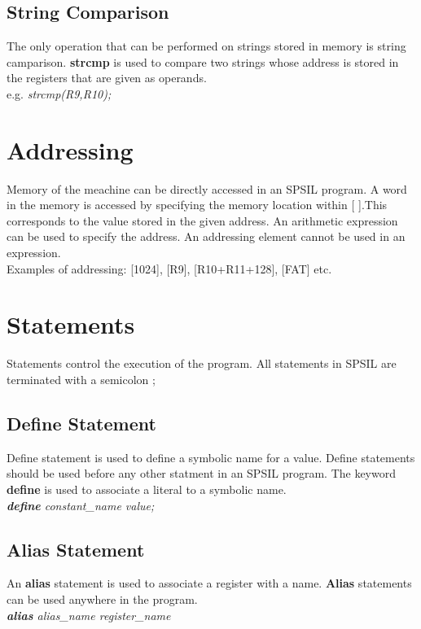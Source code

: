 \documentclass[11pt]{article}
\begin{document}
\subsection{String Comparison}
The only operation that can be performed on strings stored in memory is string camparison. \textbf{strcmp} is used to compare two strings whose address is stored in the registers that are given as operands. \\

 e.g. \textit{strcmp(R9,R10);}


\section{Addressing}
Memory of the meachine can be directly accessed in an SPSIL program. A word in the memory is accessed by specifying the memory location within [ ].This  corresponds to the value stored in the given address. An arithmetic expression can be used to specify the address. An addressing element cannot be used in an expression. \\

Examples of addressing: [1024], [R9], [R10+R11+128], [FAT] etc.

\section{Statements}

Statements control the execution of the program. All statements in SPSIL are terminated with a semicolon ;



\subsection{Define Statement}
Define statement is used to define a symbolic name for a value. Define statements should be  used before any other statment in an SPSIL program. The keyword \textbf{define} is used to associate a literal to a symbolic name. \\

\textit{ \textbf{define} constant\_name value; }


\subsection{Alias Statement}
An \textbf{alias} statement is used to  associate a register with a name. \textbf{Alias} statements can be used anywhere in the program.  \\
\indent \textit{ \textbf{alias}  alias\_name register\_name } \\
\end{document}
